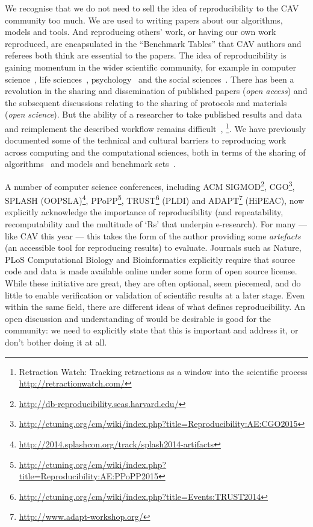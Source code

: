 \documentclass{llncs}
\begin{document}
We recognise that we do not need to sell the idea of reproducibility
to the CAV community too much. We are used to writing papers about our
algorithms, models and tools.  And reproducing others' work, or having
our own work reproduced, are encapsulated in the ``Benchmark Tables''
that CAV authors and referees both think are essential to the
papers. The idea of reproducibility is gaining momentum in the wider
scientific community, for example in computer
science~\cite{collberg-et-al:2014}, life
sciences~\cite{rollins-et-al:2014},
psychology~\cite{chambers-et-al:2014} and the social
sciences~\cite{conte-et-al:2012}.  There has been a revolution in the
sharing and dissemination of published papers (\emph{open access}) and
the subsequent discussions relating to the sharing of protocols and
materials (\emph{open science}). But the ability of a researcher to
take published results and data and reimplement the described workflow
remains
difficult~\cite{stodden-et-al:2013,sandve-et-al:2013,wilson-et-al:2014},
\footnote{Retraction Watch: Tracking retractions as a window into the
scientific process\\\url{http://retractionwatch.com/}}.  We have
previously documented some of the technical and cultural barriers to
reproducing work across computing and the computational sciences, both
in terms of the sharing of algorithms~\cite{crick-et-al_recomp2014}
and models and benchmark sets~\cite{crick-et-al_wssspe2}.

A number of computer science conferences, including ACM
SIGMOD\footnote{\url{http://db-reproducibility.seas.harvard.edu/}},
CGO\footnote{\url{http://ctuning.org/cm/wiki/index.php?title=Reproducibility:AE:CGO2015}},
SPLASH
(OOPSLA)\footnote{\url{http://2014.splashcon.org/track/splash2014-artifacts}},
PPoPP\footnote{\url{http://ctuning.org/cm/wiki/index.php?title=Reproducibility:AE:PPoPP2015}},
TRUST\footnote{\url{http://ctuning.org/cm/wiki/index.php?title=Events:TRUST2014}}
(PLDI) and ADAPT\footnote{\url{http://www.adapt-workshop.org/}}
(HiPEAC), now explicitly acknowledge the importance of reproducibility
(and repeatability, recomputability and the multitude of `Rs' that
underpin e-research).  For many --- like CAV this year --- this takes
the form of the author providing some \emph{artefacts} (an accessible
tool for reproducing results) to evaluate. Journals such as Nature,
PLoS Computational Biology and Bioinformatics explicitly require that
source code and data is made available online under some form of open
source license. While these initiative are great, they are often
optional, seem piecemeal, and do little to enable verification or
validation of scientific results at a later stage. Even within the
same field, there are different ideas of what defines
reproducibility. An open discussion and understanding of would be
desirable is good for the community: we need to explicitly state that
this is important and address it, or don't bother doing it at all.
\end{document}
